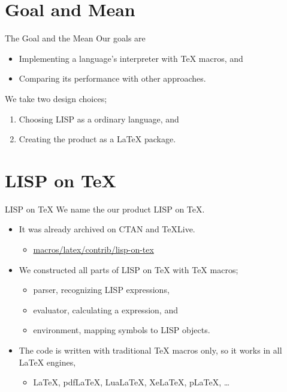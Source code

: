 \documentclass[pdftex,10pt,c,compress]{beamer}
\begin{document}
  \section{Goal and Mean}
  \begin{frame}{The Goal and the Mean}
    Our goals are
    \begin{itemize}
      \item Implementing a language's interpreter with \TeX{} macros, and
      \item Comparing its performance with other approaches. 
    \end{itemize}
    \vspace{0.5cm}
    We take two design choices;
    \begin{enumerate}
      \item Choosing LISP as a ordinary language, and
      \item Creating the product as a LaTeX package.
    \end{enumerate}
  \end{frame}

  \section{LISP on TeX}
  \begin{frame}{LISP on \TeX}
    We name the our product {\color{red} LISP on \TeX{}}.
    \begin{itemize}
      \item It was already archived on CTAN and \TeX Live.
      \begin{itemize}
        \item \url{macros/latex/contrib/lisp-on-tex}
      \end{itemize}
      \item We constructed all parts of LISP on \TeX{} with \TeX{} macros;
      \begin{itemize}
        \item parser, recognizing LISP expressions,
        \item evaluator, calculating a expression, and
        \item environment, mapping symbols to LISP objects. 
      \end{itemize}
      \item The code is written with traditional TeX macros only,
          so it works in all \LaTeX{} engines,
      \begin{itemize}
        \item \LaTeX, pdf\LaTeX, Lua\LaTeX, Xe\LaTeX, p\LaTeX, \dots
      \end{itemize}
    \end{itemize}
  \end{frame}
\end{document}
